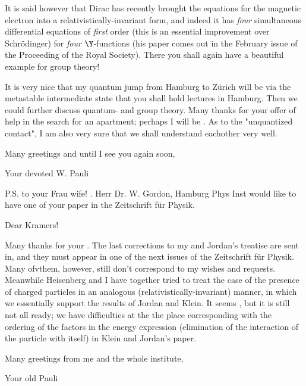 \documentclass{article}
\begin{document}
It is said however that Dirac has recently brought the equations for the magnetic electron into a relativistically-invariant form, and indeed it has \textit{four} simultaneous differential equations of \textit{first} order (this is an essential improvement over Schr\"odinger) for \textit{four} $\Y$-functions (his paper comes out in the February issue of the Proceeding of the Royal Society). There you shall again have a beautiful example for group theory!

It is very nice that my quantum jump from Hamburg to Z\"urich will be via the metastable intermediate state that you shall hold lectures in Hamburg. Then we could further discuss quantum- and group theory. Many thanks for your offer of help in the search for an apartment; perhaps I will be . As to the "unquantized contact", I am also very sure that we shall understand eachother very well.

Many greetings and until I see you again soon,

Your devoted W. Pauli

P.S.  to your Frau wife! . Herr Dr. W. Gordon, Hamburg Phys Inst would like to have one of your paper in the Zeitschrift f\"ur Physik.

\date{February 7,
1928}

Dear Kramers!

Many thanks for your . The last corrections to my and Jordan's treatise are sent in, and they must appear in one of the next issues of the Zeitschrift f\"ur Physik. Many ofvthem, however, still don't correspond to my wishes and requests. Meanwhile Heisenberg and I have together tried to treat the case of the presence of charged particles in an analogous (relativistically-invariant) manner, in which we essentially support the results of Jordan and Klein. It seems , but it is still not all ready; we have difficulties at the the place corresponding with the ordering of the factors in the energy expression (elimination of the interaction of the particle with itself) in Klein and Jordan's paper.

Many greetings from me and the whole institute,

Your old Pauli

\date{February 17, 1928}
\end{document}
